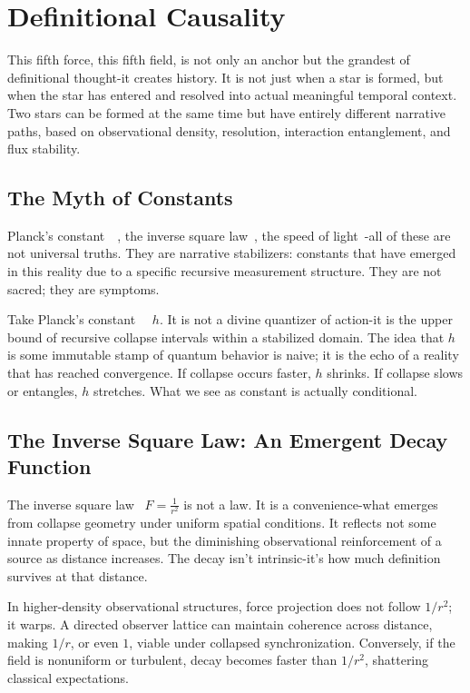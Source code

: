 \fancyhead[L]{\leftmark} %
\chapter{Definitional Causality}

This fifth force, this fifth field, is not only an anchor but the grandest of definitional thought-it creates history. It is not just when a star is formed, but when the star has entered and resolved into actual meaningful temporal context. Two stars can be formed at the same time but have entirely different narrative paths, based on observational density, resolution, interaction entanglement, and flux stability.

\section*{The Myth of Constants}

Planck’s constant~\cite{rovelli1996relational}~\cite{barbour1999end}, the inverse square law~\cite{smolin2009temporal}, the speed of light~\cite{ashtekar2004background}-all of these are not universal truths. They are narrative stabilizers: constants that have emerged in this reality due to a specific recursive measurement structure. They are not sacred; they are symptoms.

Take Planck’s constant~\cite{rovelli1996relational}~\cite{barbour1999end} $h$. It is not a divine quantizer of action-it is the upper bound of recursive collapse intervals within a stabilized domain. The idea that $h$ is some immutable stamp of quantum behavior is naive; it is the echo of a reality that has reached convergence. If collapse occurs faster, $h$ shrinks. If collapse slows or entangles, $h$ stretches. What we see as constant is actually conditional.

\section*{The Inverse Square Law: An Emergent Decay Function}

The inverse square law~\cite{smolin2009temporal} $F = \frac{1}{r^2}$ is not a law. It is a convenience-what emerges from collapse geometry under uniform spatial conditions. It reflects not some innate property of space, but the diminishing observational reinforcement of a source as distance increases. The decay isn’t intrinsic-it’s how much definition survives at that distance.

In higher-density observational structures, force projection does not follow $1/r^2$; it warps. A directed observer lattice can maintain coherence across distance, making $1/r$, or even $1$, viable under collapsed synchronization. Conversely, if the field is nonuniform or turbulent, decay becomes faster than $1/r^2$, shattering classical expectations.

